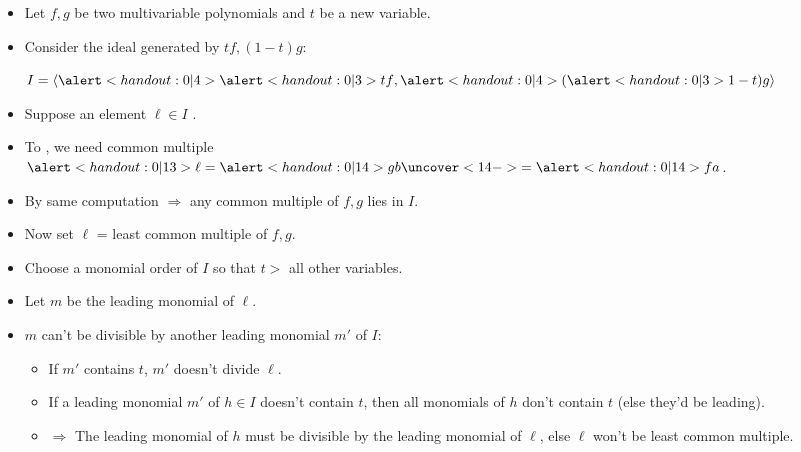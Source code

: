 \begin{frame}
\begin{itemize}
\item Let \(f, g\) be two multivariable polynomials and $t$ be a new variable. \item<2-> Consider the ideal generated by $tf,(1-t)g$:

\hfil\hfil$
I=\left \langle \alertNoH{4}{ \alertNoH{3}{t} f},\alertNoH{4}{ (\alertNoH{3}{1-t}) g} \right\rangle
$

\item<3-> Suppose an element $\ell\in I$ . 


 

\item<12-> To , we need common multiple $\alertNoH{13}{\ell=\alertNoH{14}{gb}}\uncover<14->{=\alertNoH{14}{fa}} $. 
\item<15-> By same computation $\Rightarrow$ any common multiple of $f,g$ lies in $I$. 
\item<16-> Now set $\ell$ = least common multiple of $f,g$.
\item<17-> Choose a monomial order of $I$ so that $t>$ all other variables.
\item<18-> Let $m$ be the leading monomial of $\ell$.
\item<19-> $m$ can't be divisible by another leading monomial $m'$ of $I$:
\begin{itemize}
\item<20-> If $m'$ contains $t$, $m'$ doesn't divide $\ell$.
\item<21-> If a leading monomial $m'$ of $h\in I$ doesn't contain $t$, then all monomials of $h$ don't contain $t$ (else they'd be leading). 
\item<22-> $\Rightarrow$ The leading monomial of $h$ must be divisible by the leading monomial of $\ell$, else $\ell$ won't be least common multiple.
\end{itemize}
\end{itemize}
\end{frame}

